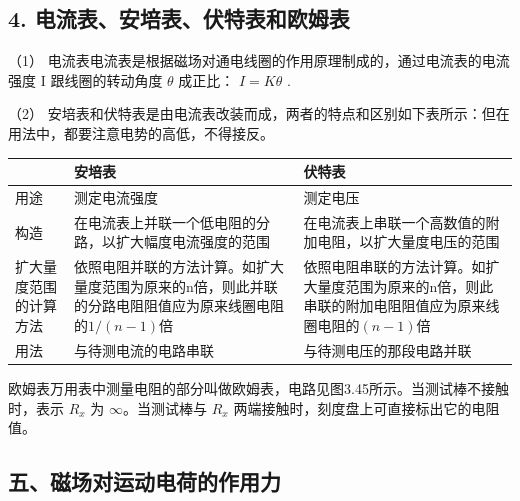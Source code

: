 \subsection{4.
电流表、安培表、伏特表和欧姆表}\label{ux7535ux6d41ux8868ux5b89ux57f9ux8868ux4f0fux7279ux8868ux548cux6b27ux59c6ux8868}

（1）
电流表电流表是根据磁场对通电线圈的作用原理制成的，通过电流表的电流强度 I
跟线圈的转动角度 \(\theta\) 成正比： \(I = K\theta\) .

（2）
安培表和伏特表是由电流表改装而成，两者的特点和区别如下表所示：但在用法中，都要注意电势的高低，不得接反。

{\def\LTcaptype{none} %
\begin{longtable}[]{@{}
  >{\raggedright\arraybackslash}p{}
  >{\raggedright\arraybackslash}p{}
  >{\raggedright\arraybackslash}p{}@{}}
\toprule\noalign{}
\begin{minipage}[b]{\linewidth}\raggedright
\end{minipage} & \begin{minipage}[b]{\linewidth}\raggedright
安培表
\end{minipage} & \begin{minipage}[b]{\linewidth}\raggedright
伏特表
\end{minipage} \\
\midrule\noalign{}
\endhead
\bottomrule\noalign{}
\endlastfoot
用途 & 测定电流强度 & 测定电压 \\
构造 & 在电流表上并联一个低电阻的分路，以扩大幅度电流强度的范围 &
在电流表上串联一个高数值的附加电阻，以扩大量度电压的范围 \\
扩大量度范围的计算方法 &
依照电阻并联的方法计算。如扩大量度范围为原来的n倍，则此并联的分路电阻阻值应为原来线圈电阻的\(1/(n-1)\)倍
&
依照电阻串联的方法计算。如扩大量度范围为原来的n倍，则此串联的附加电阻阻值应为原来线圈电阻的\((n-1)\)倍 \\
用法 & 与待测电流的电路串联 & 与待测电压的那段电路并联 \\
\end{longtable}
}

欧姆表万用表中测量电阻的部分叫做欧姆表，电路见图3.45所示。当测试棒不接触时，表示
\(R_{x}\) 为 \(\infty\)。当测试棒与 \(R_{x}\)
两端接触时，刻度盘上可直接标出它的电阻值。

\subsection{五、磁场对运动电荷的作用力}\label{ux4e94ux78c1ux573aux5bf9ux8fd0ux52a8ux7535ux8377ux7684ux4f5cux7528ux529b}

